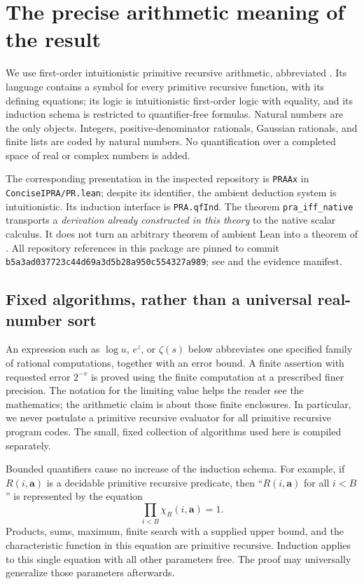 \section{The precise arithmetic meaning of the result}
\label{sec:foundations}

We use first-order intuitionistic primitive recursive arithmetic, abbreviated
\ipra. Its language contains a symbol for every primitive recursive function,
with its defining equations; its logic is intuitionistic first-order logic
with equality, and its induction schema is restricted to quantifier-free
formulas. Natural numbers are the only objects. Integers, positive-denominator
rationals, Gaussian rationals, and finite lists are coded by natural numbers.
No quantification over a completed space of real or complex numbers is added.

The corresponding presentation in the inspected repository is
\texttt{PRAAx} in \texttt{ConciseIPRA/PR.lean}; despite its identifier, the
ambient deduction system is intuitionistic. Its induction interface is
\texttt{PRA.qfInd}. The theorem \texttt{pra\_iff\_native} transports a
\emph{derivation already constructed in this theory} to the native scalar
calculus. It does not turn an arbitrary theorem of ambient Lean into a
theorem of \ipra. All repository references in this package are pinned to
commit \texttt{b5a3ad037723c44d69a3d5b28a950c554327a989}; see
\cite{ProveIt} and the evidence manifest.

\subsection{Fixed algorithms, rather than a universal real-number sort}

An expression such as $\log u$, $e^z$, or $\zeta(s)$ below abbreviates
one specified family of rational computations, together with an error
bound. A finite assertion with requested error $2^{-v}$ is proved using
the finite computation at a prescribed finer precision. The notation for
the limiting value helps the reader see the mathematics; the arithmetic
claim is about those finite enclosures. In particular, we never postulate
a primitive recursive evaluator for all primitive recursive program codes.
The small, fixed collection of algorithms used here is compiled separately.

Bounded quantifiers cause no increase of the induction schema. For example,
if $R(i,\mathbf a)$ is a decidable primitive recursive predicate, then
``$R(i,\mathbf a)$ for all $i< B$'' is represented by the equation
\[
 \prod_{i<B}\chi_R(i,\mathbf a)=1.
\]
Products, sums, maximum, finite search with a supplied upper bound, and
the characteristic function in this equation are primitive recursive.
Induction applies to this single equation with all other parameters free.
The proof may universally generalize those parameters afterwards.

